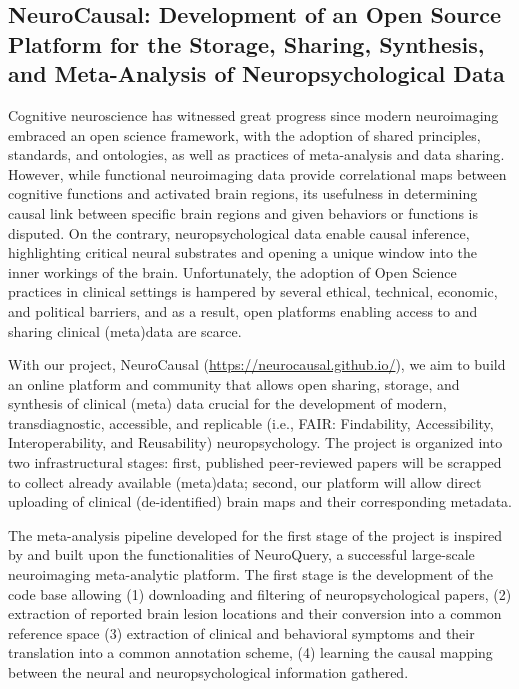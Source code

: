 \documentclass[../main.tex]{subfiles}
\begin{document}
\subsection{NeuroCausal: Development of an Open Source Platform for the Storage, Sharing, Synthesis, and Meta-Analysis of Neuropsychological Data}\label{sec:NeuroCausal}


Cognitive neuroscience has witnessed great progress since modern neuroimaging embraced an open science framework, with the adoption of shared principles\cite{Wilkinson2016}, standards\cite{Gorgolewski2016}, and ontologies\cite{poldrack_cognitive_2011}, as well as practices of meta-analysis\cite{dockes_neuroquery_2020, yarkoni_large-scale_2011} and data sharing\cite{gorgolewski2015}. However, while functional neuroimaging data provide correlational maps between cognitive functions and activated brain regions, its usefulness in determining causal link between specific brain regions and given behaviors or functions is disputed\cite{weber_functional_2010, siddiqi_causal_2022}. On the contrary, neuropsychological data enable causal inference, highlighting critical neural substrates and opening a unique window into the inner workings of the brain\cite{price_evolution_2018}. Unfortunately, the adoption of Open Science practices in clinical settings is hampered by several ethical, technical, economic, and political barriers, and as a result, open platforms enabling access to and sharing clinical (meta)data are scarce\cite{lariviere_enigma_2021}.

With our project, NeuroCausal (\url{https://neurocausal.github.io/}), we aim to build an online platform and community that allows open sharing, storage, and synthesis of clinical (meta) data crucial for the development of modern, transdiagnostic, accessible, and replicable (i.e., FAIR: Findability, Accessibility, Interoperability, and Reusability) neuropsychology. The project is organized into two infrastructural stages: first, published peer-reviewed papers will be scrapped to collect already available (meta)data; second, our platform will allow direct uploading of clinical (de-identified) brain maps and their corresponding metadata. 

The meta-analysis pipeline developed for the first stage of the project is inspired by and built upon the functionalities of NeuroQuery\cite{dockes_neuroquery_2020}, a successful large-scale neuroimaging meta-analytic platform. The first stage is the development of the code base allowing (1) downloading and filtering of neuropsychological papers, (2) extraction of reported brain lesion locations and their conversion into a common reference space (3) extraction of clinical and behavioral symptoms and their translation into a common annotation scheme, (4) learning the causal mapping between the neural and neuropsychological information gathered.
\end{document}
